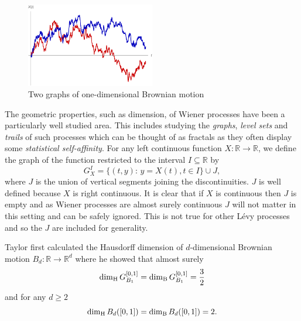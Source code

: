 \begin{figure}[h]
    \centering
	\includegraphics[width=0.5\textwidth]{pics/ch-brownian/wiener_process.pdf}
	\caption{\label{fig:brownianmotion}Two graphs of one-dimensional Brownian motion}
\end{figure}

The geometric properties, such as dimension, of Wiener processes have been a particularly well studied area. This includes studying the \emph{graphs}, \emph{level sets} and \emph{trails} of such processes which can be thought of as fractals as they often display some \emph{statistical self-affinity}. For any left continuous function $X:\mathbb{R}\to\mathbb{R}$, we define the graph of the function restricted to the interval $I \subseteq \mathbb{R}$ by
\[
G^{I}_{X}=\{(t,y) \colon \, y=X(t),t\in I\}\cup J,
\]
where $J$ is the union of vertical segments joining the discontinuities. $J$ is well defined because $X$ is right continuous. It is clear that if $X$ is continuous then $J$ is empty and as Wiener processes are almost surely continuous $J$ will not matter in this setting and can be safely ignored. This is not true for other L\'evy processes and so the $J$ are included for generality.

Taylor \cite{Ta} first calculated the Hausdorff dimension of $d$-dimensional Brownian motion $B_d:\mathbb{R}\to\mathbb{R}^d$ where he showed that almost surely
\[
\dim_\text{H} G_{B_1}^{[0,1]} = \dim_{\textup{B}}  G_{B_1}^{[0,1]} = \frac{3}{2}         
\]
and for any $d\ge 2$
\[
\dim_\text{H} B_d([0,1]) = \dim_{\textup{B}} B_d([0,1]) =  2.
\]



